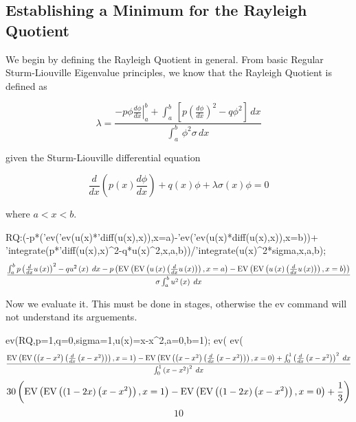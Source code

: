 
\subsection*{Establishing a Minimum for the Rayleigh Quotient}

We begin by defining the Rayleigh Quotient in general.  From basic
Regular Sturm-Liouville Eigenvalue principles, we know that the 
Rayleigh Quotient is defined as

\[\lambda =\frac{-p\phi \left. \frac{d\phi }{dx}\right| ^{b}_{a}+\int _{a}^{b}\, \left[p \left( \frac{d\phi }{dx}\right)^{2}-q\phi ^{2}\right] \, dx}{\int _{a}^{b}\, \phi ^{2}\sigma \, dx}\]


given the Sturm-Liouville differential equation

\[\frac{d}{dx}\left( p\left( x\right) \frac{d\phi }{dx}\right) +q\left( x\right) \phi +\lambda \sigma \left( x\right) \phi =0\]


where $a<x<b$.

\beginmaxima
RQ:(-p*('ev('ev(u(x)*'diff(u(x),x)),x=a)-'ev('ev(u(x)*diff(u(x),x)),x=b))+
'integrate(p*'diff(u(x),x)^2-q*u(x)^2,x,a,b))/'integrate(u(x)^2*sigma,x,a,b);
\maximatexoutput
\[  \frac{\int_{a}^{b}{p\*\left(\frac{d}{d\*x}\*u\left(x\right)\right)^{2}-q\*u^{2 }\left(x\right)\;dx}-p\*\left(\mathrm{EV}\left(\mathrm{EV}\left(u\left(x\right)\*\left(\frac{d}{d\*x}\*u\left(x\right)\right)\right),\linebreak[0]x=a\right)-\mathrm{EV}\left(\mathrm{EV}\left(u\left(x\right)\*\left(\frac{d}{d\*x}\*u\left(x\right)\right)\right),\linebreak[0]x=b\right)\right)}{\sigma\*\int_{a}^{b}{u^{2 }\left(x\right)\;dx}} \]
\endmaxima

Now we evaluate it.  This must be done in stages, otherwise the ev command
will not understand its arguements.

\beginmaxima
ev(RQ,p=1,q=0,sigma=1,u(x)=x-x^2,a=0,b=1);
ev(%
ev(%
\maximatexoutput
\[  \frac{\mathrm{EV}\left(\mathrm{EV}\left(\left(x-x^{2}\right)\*\left(\frac{d}{d\*x}\*\left(x-x^{2}\right)\right)\right),\linebreak[0]x=1\right)-\mathrm{EV}\left(\mathrm{EV}\left(\left(x-x^{2}\right)\*\left(\frac{d}{d\*x}\*\left(x-x^{2}\right)\right)\right),\linebreak[0]x=0\right)+\int_{0}^{1}{\left(\frac{d}{d\*x}\*\left(x-x^{2}\right)\right)^{2}\;dx}}{\int_{0}^{1}{\left(x-x^{2}\right)^{2}\;dx}} \]
\[  30\*\left(\mathrm{EV}\left(\mathrm{EV}\left(\left(1-2\*x\right)\*\left(x-x^{2}\right)\right),\linebreak[0]x=1\right)-\mathrm{EV}\left(\mathrm{EV}\left(\left(1-2\*x\right)\*\left(x-x^{2}\right)\right),\linebreak[0]x=0\right)+\frac{1}{3}\right) \]
\[  10 \]
\endmaxima

